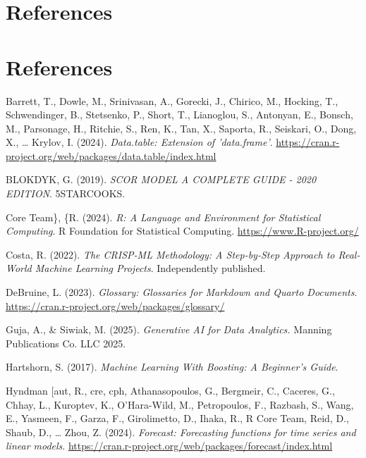 \documentclass[
  american,
  10,
  a4paper,
]{book}
\newlength{\cslhangindent}
\newenvironment{CSLReferences}[2] %
 {\begin{list}{}{%
  \setlength{\itemindent}{0pt}
  \setlength{\leftmargin}{0pt}
  \setlength{\parsep}{0pt}
  \ifodd #1
   \setlength{\leftmargin}{\cslhangindent}
   \setlength{\itemindent}{-1\cslhangindent}
  \fi
  \setlength{\itemsep}{#2\baselineskip}}}
 {\end{list}}
\theoremstyle{definition}
\theoremstyle{remark}
\begin{document}
\chapter{References}\label{references}

\chapter*{References}\label{references-1}


\label{refs}
\begin{CSLReferences}{1}{0}
Barrett, T., Dowle, M., Srinivasan, A., Gorecki, J., Chirico, M.,
Hocking, T., Schwendinger, B., Stetsenko, P., Short, T., Lianoglou, S.,
Antonyan, E., Bonsch, M., Parsonage, H., Ritchie, S., Ren, K., Tan, X.,
Saporta, R., Seiskari, O., Dong, X., \ldots{} Krylov, I. (2024).
\emph{Data.table: {Extension} of 'data.frame'}.
\url{https://cran.r-project.org/web/packages/data.table/index.html}

BLOKDYK, G. (2019). \emph{{SCOR} {MODEL} {A} {COMPLETE} {GUIDE} - 2020
{EDITION}}. 5STARCOOKS.

Core Team\}, \{R. (2024). \emph{R: {A} {Language} and {Environment} for
{Statistical} {Computing}}. R Foundation for Statistical Computing.
\url{https://www.R-project.org/}

Costa, R. (2022). \emph{The {CRISP}-{ML} {Methodology}: {A}
{Step}-by-{Step} {Approach} to {Real}-{World} {Machine} {Learning}
{Projects}}. Independently published.

DeBruine, L. (2023). \emph{Glossary: {Glossaries} for {Markdown} and
{Quarto} {Documents}}.
\url{https://cran.r-project.org/web/packages/glossary/}

Guja, A., \& Siwiak, M. (2025). \emph{Generative {AI} for {Data}
{Analytics}.} Manning Publications Co. LLC 2025.

Hartshorn, S. (2017). \emph{Machine {Learning} {With} {Boosting}: {A}
{Beginner}'s {Guide}}.

Hyndman {[}aut, R., cre, cph, Athanasopoulos, G., Bergmeir, C., Caceres,
G., Chhay, L., Kuroptev, K., O'Hara-Wild, M., Petropoulos, F., Razbash,
S., Wang, E., Yasmeen, F., Garza, F., Girolimetto, D., Ihaka, R., R Core
Team, Reid, D., Shaub, D., \ldots{} Zhou, Z. (2024). \emph{Forecast:
Forecasting functions for time series and linear models}.
\url{https://cran.r-project.org/web/packages/forecast/index.html}


\end{CSLReferences}
\end{document}
